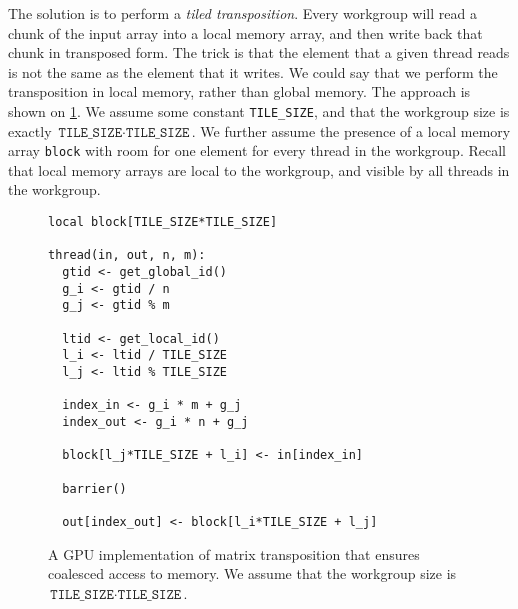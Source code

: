 \begin{table}
\begin{subtable}{\textwidth}
  \caption{Tabulation of computed indexes for the transposition kernel on \cref{fig:coalesced-gpu-transposition}.  We assume $n=m=100$, and $\texttt{TILE\_SIZE}=2$ (this is an implausibly small number, $16$ is more realistic).}
  \label{tab:coalesced-gpu-indices}
\end{subtable}

  \caption{Tables of indices computed for the two transposition kernels.}
  \label{tab:transpose-gpu-indices}
\end{table}

The solution is to perform a \textit{tiled transposition}.  Every
workgroup will read a chunk of the input array into a local memory
array, and then write back that chunk in transposed form.  The trick
is that the element that a given thread reads is not the same as the
element that it writes.  We could say that we perform the
transposition in local memory, rather than global memory.  The
approach is shown on \cref{fig:coalesced-gpu-transposition}.  We
assume some constant \texttt{TILE\_SIZE}, and that the workgroup size
is exactly $\texttt{TILE\_SIZE}\cdot\texttt{TILE\_SIZE}$.  We further
assume the presence of a local memory array \texttt{block} with room
for one element for every thread in the workgroup.  Recall that local
memory arrays are local to the workgroup, and visible by all threads
in the workgroup.

\begin{figure}

\begin{lstlisting}[language={}]
local block[TILE_SIZE*TILE_SIZE]

thread(in, out, n, m):
  gtid <- get_global_id()
  g_i <- gtid / n
  g_j <- gtid % m

  ltid <- get_local_id()
  l_i <- ltid / TILE_SIZE
  l_j <- ltid % TILE_SIZE

  index_in <- g_i * m + g_j
  index_out <- g_i * n + g_j

  block[l_j*TILE_SIZE + l_i] <- in[index_in]

  barrier()

  out[index_out] <- block[l_i*TILE_SIZE + l_j]
\end{lstlisting}

  \caption{A GPU implementation of matrix transposition that ensures
    coalesced access to memory.  We assume that the workgroup size is
    $\texttt{TILE\_SIZE}\cdot\texttt{TILE\_SIZE}$.}
  \label{fig:coalesced-gpu-transposition}
\end{figure}


